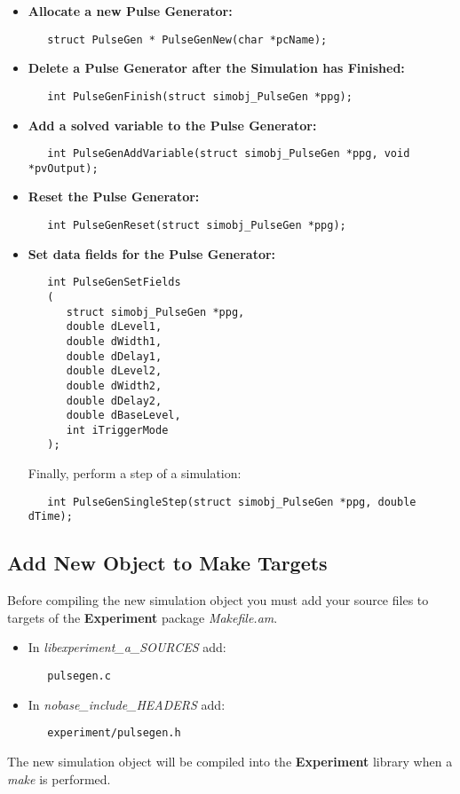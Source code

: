 \documentclass[12pt]{article}
\begin{document}
\begin{itemize}
\item {\bf Allocate a new Pulse Generator:}
\begin{verbatim}
   struct PulseGen * PulseGenNew(char *pcName);
\end{verbatim}

\item {\bf Delete a Pulse Generator after the Simulation has Finished:}
\begin{verbatim}
   int PulseGenFinish(struct simobj_PulseGen *ppg);
\end{verbatim}

\item {\bf Add a solved variable to the Pulse Generator:}
\begin{verbatim}
   int PulseGenAddVariable(struct simobj_PulseGen *ppg, void *pvOutput);
\end{verbatim}

\item {\bf Reset the Pulse Generator:}
\begin{verbatim}
   int PulseGenReset(struct simobj_PulseGen *ppg);
\end{verbatim}

\item{\bf Set data fields for the Pulse Generator:}
\begin{verbatim}
   int PulseGenSetFields
   (
      struct simobj_PulseGen *ppg,
      double dLevel1,
      double dWidth1,
      double dDelay1,
      double dLevel2,
      double dWidth2,
      double dDelay2,
      double dBaseLevel,
      int iTriggerMode
   );
\end{verbatim}
Finally, perform a step of a simulation:
\begin{verbatim}
   int PulseGenSingleStep(struct simobj_PulseGen *ppg, double dTime);
\end{verbatim}
\end{itemize}

\subsection*{Add New Object to Make Targets}

Before compiling the new simulation object you must add your source files to targets of the {\bf Experiment} package {\it Makefile.am}.

\begin{itemize}
   \item In {\it libexperiment\_a\_SOURCES} add:
\begin{verbatim}
   pulsegen.c
\end{verbatim}
   \item In {\it nobase\_include\_HEADERS} add:
\begin{verbatim}
   experiment/pulsegen.h 
\end{verbatim}
\end{itemize}
The new simulation object will be compiled into the {\bf Experiment} library when a {\it make} is performed.
\end{document}
